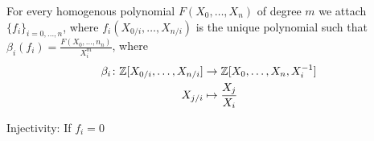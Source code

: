 \newcommand{\sheet}{7}




\maketitle{}

\begin{exercise}{2}
    For every homogenous polynomial $F(X_0, \dots, X_n)$ of degree $m$ we attach
    $\{f_i\}_{i=0,\dots,n}$, where $f_i(X_{0/i}, \dots, X_{n/i})$ is the unique
    polynomial such that $\beta_i(f_i) = \frac{F(X_0, \dots, n_n)}{X^m_i}$,
    where
    \begin{align*}
        \beta_i \colon \mathbb{Z}[X_{0/i}, \dots, X_{n/i}] &\to \mathbb{Z}[X_0, \dots,
        X_n, X^{-1}_i] \\
        X_{j/i} &\mapsto \frac{X_j}{X_i}
    \end{align*}
    
    Injectivity:
    If $f_i = 0$
\end{exercise}


